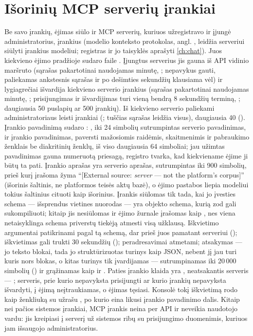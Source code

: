 \section{Išorinių MCP serverių įrankiai}\label{sec:tools:mcp}

Be savo įrankių, ėjimas siūlo ir MCP serverių, kuriuos užregistravo ir įjungė administratorius,
įrankius (modelio konteksto protokolas, angl. , leidžia serveriui
siūlyti įrankius modeliui; registras ir jo taisyklės aprašyti \cref{ch:chat}). Juos kiekvieno
ėjimo pradžioje sudaro  faile . Įjungtus serverius jis gauna
iš API vidinio maršruto  (sąrašas pakartotinai
naudojamas minutę, ; nepavykus gauti, paliekamas ankstesnis sąrašas ir po dešimties
sekundžių klausiama vėl) ir lygiagrečiai išvardija kiekvieno serverio įrankius (sąrašas
pakartotinai naudojamas minutę, ; prisijungimas ir išvardijimas turi vieną
bendrą 8 sekundžių terminą, ; daugiausia 50 puslapių ar 500 įrankių).
Iš kiekvieno serverio paliekami administratoriaus leisti įrankiai (; tuščias
sąrašas leidžia visus), daugiausia 40 (). Įrankio pavadinimą
 sudaro : , iki 24 simbolių sutrumpintas
serverio pavadinimas, \code{_} ir įrankio pavadinimas, paversti mažosiomis raidėmis, skaitmenimis
ir pabraukimo ženklais be diakritinių ženklų, iš viso daugiausia 64 simboliai; jau užimtas
pavadinimas gauna numeruotą priesagą, registro tvarka, kad kiekviename ėjime ji būtų ta pati.
Įrankio aprašas yra serverio aprašas, sutrumpintas iki 900 simbolių, prieš kurį
įrašoma žyma \enquote{[External source: \emph{server} --- not the platform's corpus]} (išorinis šaltinis, ne
platformos teisės aktų bazė), o ėjimo pastabos liepia modeliui tokius šaltinius cituoti kaip
išorinius. Įrankis siūlomas tik tada, kai jo įvesties schema --- išsprendus vietines nuorodas ---
yra objekto schema, kurią zod gali sukompiliuoti; kitaip jis nesiūlomas ir ėjimo žurnale
įrašomas kaip , nes viena netaisyklinga schema priverstų tiekėją atmesti
visą užklausą. Iškvietimo argumentai patikrinami pagal tą schemą, dar prieš juos pamatant
serveriui (); iškvietimas gali trukti 30 sekundžių
(); peradresavimai atmetami; atsakymas --- jo teksto blokai, tada jo
struktūrizuotas turinys kaip JSON, nebent jį jau turi kuris nors blokas, o kitas turinys tik
įvardijamas --- sutrumpinamas iki 20\,000 simbolių () ir grąžinamas kaip
 ir . Paties įrankio klaida yra , neatsakantis
serveris --- ; serveris, prie kurio nepavyksta prisijungti ar kurio
įrankių nepavyksta išvardyti, į ėjimą neįtraukiamas, o ėjimas tęsiasi. Konsolė tokį iškvietimą
rodo kaip ženkliuką su užrašu , po kurio eina likusi įrankio pavadinimo
dalis. Kitaip nei pačios sistemos įrankiai, MCP įrankis neina per API ir neveikia naudotojo
vardu: jis kreipiasi į serverį už sistemos ribų su prisijungimo duomenimis, kuriuos jam išsaugojo
administratorius.
